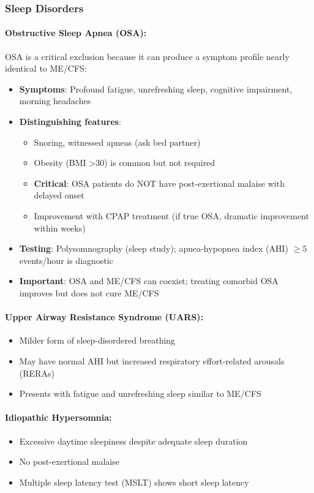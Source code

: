 \subsubsection{Sleep Disorders}

\begin{warning}
\label{warn:osa-mimic}

\paragraph{Obstructive Sleep Apnea (OSA):}
OSA is a critical exclusion because it can produce a symptom profile nearly identical to ME/CFS:
\begin{itemize}
    \item \textbf{Symptoms}: Profound fatigue, unrefreshing sleep, cognitive impairment, morning headaches
    \item \textbf{Distinguishing features}:
    \begin{itemize}
        \item Snoring, witnessed apneas (ask bed partner)
        \item Obesity (BMI >30) is common but not required
        \item \textbf{Critical}: OSA patients do NOT have post-exertional malaise with delayed onset
        \item Improvement with CPAP treatment (if true OSA, dramatic improvement within weeks)
    \end{itemize}
    \item \textbf{Testing}: Polysomnography (sleep study); apnea-hypopnea index (AHI) $\geq 5$ events/hour is diagnostic
    \item \textbf{Important}: OSA and ME/CFS can coexist; treating comorbid OSA improves but does not cure ME/CFS
\end{itemize}

\paragraph{Upper Airway Resistance Syndrome (UARS):}
\begin{itemize}
    \item Milder form of sleep-disordered breathing
    \item May have normal AHI but increased respiratory effort-related arousals (RERAs)
    \item Presents with fatigue and unrefreshing sleep similar to ME/CFS
\end{itemize}

\paragraph{Idiopathic Hypersomnia:}
\begin{itemize}
    \item Excessive daytime sleepiness despite adequate sleep duration
    \item No post-exertional malaise
    \item Multiple sleep latency test (MSLT) shows short sleep latency
\end{itemize}
\end{warning}

